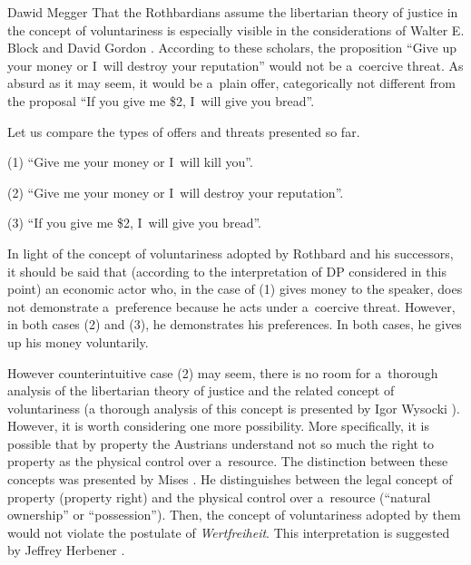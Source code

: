 \begin{artengenv}{Dawid Megger}
That the Rothbardians assume the libertarian theory of justice in the concept of voluntariness is especially visible in the considerations of Walter E. Block and David Gordon 
\parencite*[][]{block_blackmail_1985}. %
 According to these scholars, the proposition ``Give up your money or I~will destroy your reputation'' would not be a~coercive threat. As absurd as it may seem, it would be a~plain offer, categorically not different from the proposal ``If you give me \$2, I~will give you bread''.



Let us compare the types of offers and threats presented so far.

\medskip

\noindent (1) ``Give me your money or I~will kill you''.



\noindent (2) ``Give me your money or I~will destroy your reputation''.



\noindent (3) ``If you give me \$2, I~will give you bread''.

\medskip

In light of the concept of voluntariness adopted by Rothbard and his successors, it should be said that (according to the interpretation of DP considered in this point) an economic actor who, in the case of (1) gives money to the speaker, does not demonstrate a~preference because he acts under a~coercive threat. However, in both cases (2) and (3), he demonstrates his preferences. In both cases, he gives up his money voluntarily.



However counterintuitive case (2) may seem, there is no room for a~thorough analysis of the libertarian theory of justice and the related concept of voluntariness (a thorough analysis of this concept is presented by Igor Wysocki 
\parencite*[][]{wysocki_austro-libertarian_2021}%
). However, it is worth considering one more possibility. More specifically, it is possible that by property the Austrians understand not so much the right to property as the physical control over a~resource. The distinction between these concepts was presented by Mises 
\parencite*[][pp.37–39]{mises_socialism_1962}. %
 He distinguishes between the legal concept of property (property right) and the physical control over a~resource (``natural ownership'' or ``possession''). Then, the concept of voluntariness adopted by them would not violate the postulate of \textit{Wertfreiheit}. This interpretation is suggested by Jeffrey Herbener 
\parencite*[][p.99]{herbener_pareto_1997}.%





\end{artengenv}
